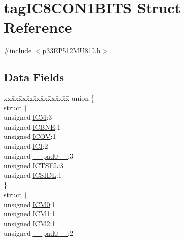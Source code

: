 \hypertarget{structtag_i_c8_c_o_n1_b_i_t_s}{}\section{tag\+I\+C8\+C\+O\+N1\+B\+I\+TS Struct Reference}
\label{structtag_i_c8_c_o_n1_b_i_t_s}


{\ttfamily \#include $<$p33\+E\+P512\+M\+U810.\+h$>$}

\subsection*{Data Fields}
\begin{DoxyCompactItemize}
\item 
\begin{tabbing}
xx\=xx\=xx\=xx\=xx\=xx\=xx\=xx\=xx\=\kill
union \{\\
\>struct \{\\
\>\>unsigned \hyperlink{structtag_i_c8_c_o_n1_b_i_t_s_ad3edde44ecb2d349ffa2decd0a251c20}{ICM}:3\\
\>\>unsigned \hyperlink{structtag_i_c8_c_o_n1_b_i_t_s_a824e7dcca83939e1b049d63ffcee33e9}{ICBNE}:1\\
\>\>unsigned \hyperlink{structtag_i_c8_c_o_n1_b_i_t_s_a49392949376ba0bf58cf8db889e86c94}{ICOV}:1\\
\>\>unsigned \hyperlink{structtag_i_c8_c_o_n1_b_i_t_s_a72486dcb868aad2d5c978494691356cc}{ICI}:2\\
\>\>unsigned \hyperlink{structtag_i_c8_c_o_n1_b_i_t_s_adf71f3d8410c1f1dbbc96680a92c49af}{\_\_pad0\_\_}:3\\
\>\>unsigned \hyperlink{structtag_i_c8_c_o_n1_b_i_t_s_a7a9dd41b5f93eb620df7fa336e452677}{ICTSEL}:3\\
\>\>unsigned \hyperlink{structtag_i_c8_c_o_n1_b_i_t_s_af441b36127c0bb7a35162dfc9a64103c}{ICSIDL}:1\\
\>\} \\
\>struct \{\\
\>\>unsigned \hyperlink{structtag_i_c8_c_o_n1_b_i_t_s_a649b1dd9bca75e558f37a9f52a829bd4}{ICM0}:1\\
\>\>unsigned \hyperlink{structtag_i_c8_c_o_n1_b_i_t_s_af3fe77ef9f8ca41ff11519f445e7bc77}{ICM1}:1\\
\>\>unsigned \hyperlink{structtag_i_c8_c_o_n1_b_i_t_s_a3c62c9cbbc3a406402126c932b709db8}{ICM2}:1\\
\>\>unsigned \hyperlink{structtag_i_c8_c_o_n1_b_i_t_s_adf71f3d8410c1f1dbbc96680a92c49af}{\_\_pad0\_\_}:2\\

\end{tabbing}
\end{DoxyCompactItemize}
